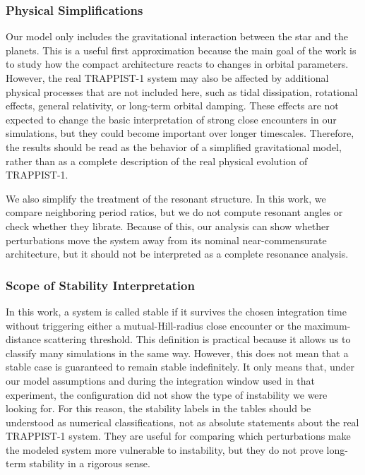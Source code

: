 \documentclass{aa}
\begin{document}
\subsubsection{Physical Simplifications}
Our model only includes the gravitational interaction between the star and the planets. This is a useful first approximation because the main goal of the work is to study how the compact architecture reacts to changes in orbital parameters. However, the real TRAPPIST-1 system may also be affected by additional physical processes that are not included here, such as tidal dissipation, rotational effects, general relativity, or long-term orbital damping. These effects are not expected to change the basic interpretation of strong close encounters in our simulations, but they could become important over longer timescales. Therefore, the results should be read as the behavior of a simplified gravitational model, rather than as a complete description of the real physical evolution of TRAPPIST-1. 

We also simplify the treatment of the resonant structure. In this work, we compare neighboring period ratios, but we do not compute resonant angles or check whether they librate. Because of this, our analysis can show whether perturbations move the system away from its nominal near-commensurate architecture, but it should not be interpreted as a complete resonance analysis.

\subsubsection{Scope of Stability Interpretation}
In this work, a system is called stable if it survives the chosen integration time without triggering either a mutual-Hill-radius close encounter or the maximum-distance scattering threshold. This definition is practical because it allows us to classify many simulations in the same way. However, this does not mean that a stable case is guaranteed to remain stable indefinitely. It only means that, under our model assumptions and during the integration window used in that experiment, the configuration did not show the type of instability we were looking for. For this reason, the stability labels in the tables should be understood as numerical classifications, not as absolute statements about the real TRAPPIST-1 system. They are useful for comparing which perturbations make the modeled system more vulnerable to instability, but they do not prove long-term stability in a rigorous sense.
\end{document}
